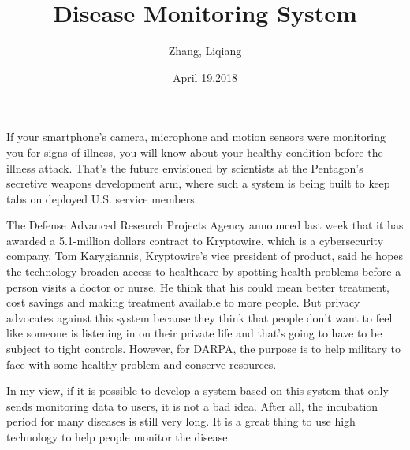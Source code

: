 \documentclass{article}
\author{Zhang, Liqiang}
\date{April 19,2018}
\title{Disease Monitoring System}
\begin{document}
\maketitle
\par
If your smartphone's camera, microphone and motion sensors were monitoring you for signs of illness, you will know about your healthy condition before the illness attack. That's the future envisioned by scientists at the Pentagon's secretive weapons development arm, where such a system is being built to keep tabs on deployed U.S. service members.
\par
The Defense Advanced Research Projects Agency announced last week that it has awarded a 5.1-million dollars contract to Kryptowire, which is a cybersecurity company. Tom Karygiannis, Kryptowire's vice president of product, said he hopes the technology broaden access to healthcare by spotting health problems before a person visits a doctor or nurse. He think that his could mean better treatment, cost savings and making treatment available to more people. But privacy advocates against this system because they think that people don't want to feel like someone is listening in on their private life and that's going to have to be subject to tight controls. However, for DARPA, the purpose is to help military to face with some healthy problem and conserve resources.
\par
In my view, if it is possible to develop a system based on this system that only sends monitoring data to users, it is not a bad idea. After all, the incubation period for many diseases is still very long. It is a great thing to use high technology to help people monitor the disease.
\end{document}
